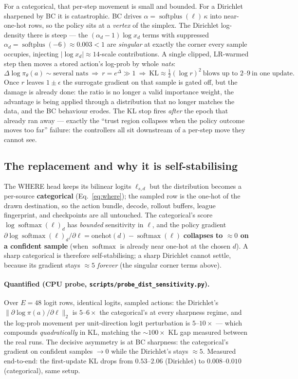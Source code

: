 \documentclass[11pt]{article}
\newcommand{\KL}{\mathrm{KL}}
\newcommand{\pol}{\pi_\theta}
\newcommand{\softplus}{\operatorname{softplus}}
\newcommand{\softmax}{\operatorname{softmax}}
\newcommand{\cd}[1]{\texttt{#1}}
\begin{document}
For a categorical, that per-step movement is small and bounded. For a Dirichlet sharpened by BC it is
catastrophic. BC drives $\alpha=\softplus(\ell)\,\kappa$ into near-one-hot rows, so the policy sits at a
\emph{vertex} of the simplex. The Dirichlet log-density there is steep --- the $(\alpha_d-1)\log x_d$
terms with suppressed $\alpha_d=\softplus(-6)\approx0.003<1$ are \emph{singular} at exactly the corner
every sample occupies, injecting $|\log x_d|\approx14$-scale contributions. A single clipped,
LR-warmed step then moves a stored action's log-prob by whole \emph{nats}:
\[
\Delta\log\pol(a)\sim\text{several nats}\ \Rightarrow\ r=e^{\Delta}\gg1\ \Rightarrow\
\KL\approx\tfrac12(\log r)^2\ \text{blows up to }2\text{--}9\ \text{in one update.}
\]
Once $r$ leaves $1\pm\epsilon$ the surrogate gradient on that sample is gated off, but the damage is
already done: the ratio is no longer a valid importance weight, the advantage is being applied through a
distribution that no longer matches the data, and the BC behaviour erodes. The KL stop fires
\emph{after} the epoch that already ran away --- exactly the ``trust region collapses when the policy
outcome moves too far'' failure: the controllers all sit downstream of a per-step move they cannot see.

\subsection{The replacement and why it is self-stabilising}
The WHERE head keeps its bilinear logits $\ell_{s,d}$ but the distribution becomes a per-source
\textbf{categorical} (Eq.~\eqref{eq:where}); the sampled row is the one-hot of the drawn destination, so
the action bundle, decode, rollout buffers, league fingerprint, and checkpoints are all untouched. The
categorical's score $\log\softmax(\ell)_d$ has \emph{bounded} sensitivity in $\ell$, and the policy
gradient $\partial\log\softmax(\ell)_d/\partial\ell=\mathrm{onehot}(d)-\softmax(\ell)$ \textbf{collapses
to $\approx0$ on a confident sample} (when $\softmax$ is already near one-hot at the chosen $d$). A sharp
categorical is therefore self-stabilising; a sharp Dirichlet cannot settle, because its gradient stays
$\approx5$ \emph{forever} (the singular corner terms above).

\paragraph{Quantified (CPU probe, \cd{scripts/probe\_dist\_sensitivity.py}).} Over $E{=}48$ logit rows,
identical logits, sampled actions: the Dirichlet's $\lVert\partial\log\pi(a)/\partial\ell\rVert_2$ is
$5$--$6\times$ the categorical's at every sharpness regime, and the log-prob movement per unit-direction
logit perturbation is $5$--$10\times$ --- which compounds \emph{quadratically} in KL, matching the
$\sim$$100\times$ KL gap measured between the real runs. The decisive asymmetry is at BC sharpness: the
categorical's gradient on confident samples $\to0$ while the Dirichlet's stays $\approx5$. Measured
end-to-end: the first-update KL drops from $0.53$--$2.06$ (Dirichlet) to $0.008$--$0.010$ (categorical),
same setup.
\end{document}
